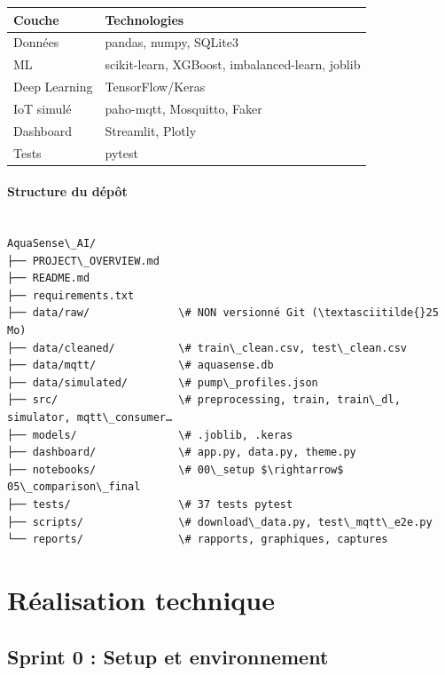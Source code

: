 \documentclass[11pt,a4paper]{report}
\begin{document}
{\small
\begin{longtable}{@{}>{\raggedright\arraybackslash}p{}>{\raggedright\arraybackslash}p{}@{}}
\toprule
\rowcolor{EHTPTableHead}Couche & Technologies \\
\midrule
Données & pandas, numpy, SQLite3 \\
ML & scikit-learn, XGBoost, imbalanced-learn, joblib \\
Deep Learning & TensorFlow/Keras \\
IoT simulé & paho-mqtt, Mosquitto, Faker \\
Dashboard & Streamlit, Plotly \\
Tests & pytest \\
\bottomrule
\end{longtable}
}

\subsection{Structure du dépôt}

\begin{lstlisting}

AquaSense\_AI/
├── PROJECT\_OVERVIEW.md
├── README.md
├── requirements.txt
├── data/raw/              \# NON versionné Git (\textasciitilde{}25 Mo)
├── data/cleaned/          \# train\_clean.csv, test\_clean.csv
├── data/mqtt/             \# aquasense.db
├── data/simulated/        \# pump\_profiles.json
├── src/                   \# preprocessing, train, train\_dl, simulator, mqtt\_consumer…
├── models/                \# .joblib, .keras
├── dashboard/             \# app.py, data.py, theme.py
├── notebooks/             \# 00\_setup $\rightarrow$ 05\_comparison\_final
├── tests/                 \# 37 tests pytest
├── scripts/               \# download\_data.py, test\_mqtt\_e2e.py
└── reports/               \# rapports, graphiques, captures

\end{lstlisting}

\part{Réalisation technique}

\clearpage

\chapter[Sprint 0]{Sprint 0 : Setup et environnement}
\end{document}
